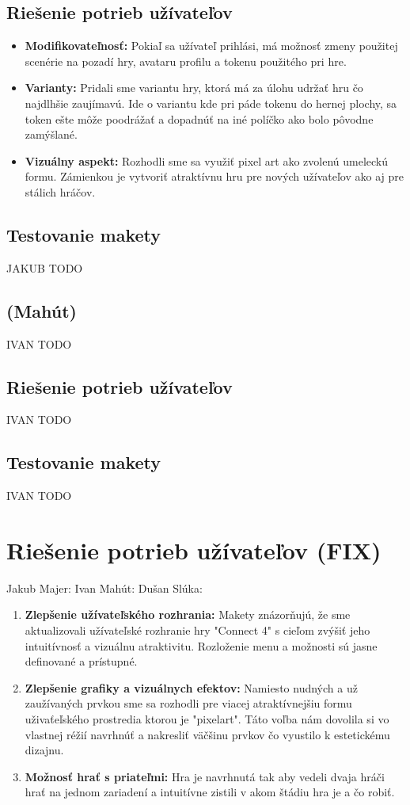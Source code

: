 \documentclass[a4paper, 11pt, onecolumn]{article}
\begin{document}
\subsection*{Riešenie potrieb užívateľov}
\begin{itemize}
  \item \textbf{Modifikovateľnosť:} Pokiaľ sa užívateľ prihlási, má možnosť zmeny 
               použitej scenérie na pozadí hry, avataru profilu a tokenu použitého pri hre.
  \item \textbf{Varianty:} Pridali sme variantu hry, ktorá má za úlohu udržať hru čo najdlhšie
                zaujímavú. Ide o variantu kde pri páde tokenu do hernej plochy, sa token
                ešte môže poodrážať a dopadnúť na iné políčko ako bolo pôvodne zamýšlané.
  \item \textbf{Vizuálny aspekt:} Rozhodli sme sa využiť pixel art ako zvolenú umeleckú formu.
                Zámienkou je vytvoriť atraktívnu hru pre nových užívateľov ako aj pre stálich hráčov.
\end{itemize}
\subsection*{Testovanie makety}
JAKUB TODO

\subsection{(Mahút)}
IVAN TODO
\subsection*{Riešenie potrieb užívateľov}
IVAN TODO
\subsection*{Testovanie makety}
IVAN TODO



\section{Riešenie potrieb užívateľov (FIX)}
Jakub Majer:
Ivan Mahút:
Dušan Slúka:
\begin{enumerate}
    \item \textbf{Zlepšenie užívateľského rozhrania:} Makety znázorňujú, že sme aktualizovali užívateľské rozhranie hry "Connect 4" s cieľom zvýšiť jeho intuitívnosť a vizuálnu atraktivitu. Rozloženie menu a možnosti sú jasne definované a prístupné.
    \item \textbf{Zlepšenie grafiky a vizuálnych efektov:} Namiesto nudných a už zaužívaných prvkou sme sa rozhodli pre viacej atraktívnejšiu formu uživaťeľského prostredia ktorou je "pixelart". Táto voľba nám dovolila si vo vlastnej réžií navrhnúť a nakresliť väčšinu prvkov čo vyustilo k estetickému dizajnu.
    \item \textbf{Možnosť hrať s priateľmi:} Hra je navrhnutá tak aby vedeli dvaja hráči hrať na jednom zariadení a intuitívne zistili v akom štádiu hra je a čo robiť.
\end{enumerate}
\end{document}
